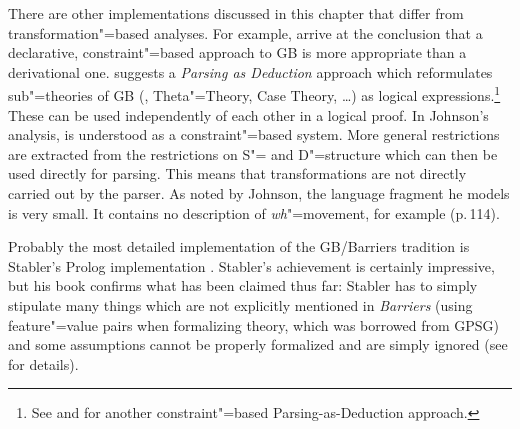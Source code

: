 There are other implementations discussed in this chapter that differ from transformation"=based analyses. For example, \citet[, Section~4]{KT91a}
arrive at the conclusion that a declarative, constraint"=based approach to GB is more appropriate than a derivational one. \citet{Johnson89a}
suggests a \emph{Parsing as Deduction} approach which reformulates sub"=theories of GB (\xbart,
Theta"=Theory, Case Theory, \ldots) as logical expressions.\footnote{
	See  and  for another constraint"=based Parsing-as-Deduction approach.
}
These can be used independently of each other in a logical proof. In Johnson's analysis, \gbt is understood as a constraint"=based system. 
More general restrictions are extracted from the restrictions on S"= and D"=structure which can then be used directly for parsing. This means that 
transformations are not directly carried out by the parser. As noted by Johnson, the language fragment he models is very small. It contains no
description of \emph{wh}"=movement, for example (p.\,114). 

Probably the most detailed implementation of the GB/Barriers tradition is Stabler's Prolog implementation \citeyearpar{Stabler92a-u}.
Stabler's achievement is certainly impressive, but his book confirms what has been claimed thus far: Stabler has to simply stipulate many
things which are not explicitly mentioned in \emph{Barriers} (\eg using feature"=value pairs when formalizing \xbar theory, which was borrowed
from GPSG\indexgpsg) and some assumptions cannot be properly formalized and are simply ignored (see  for details).


